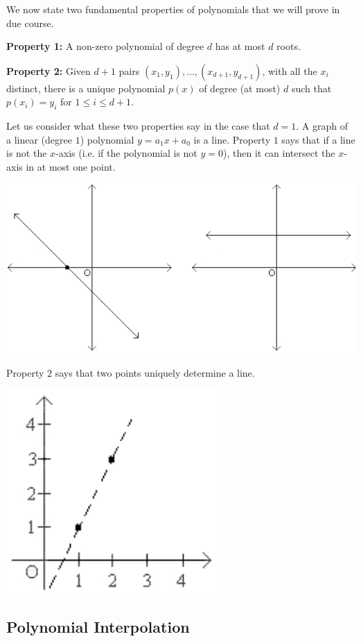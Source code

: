 \documentclass[11pt,fleqn]{article}
\begin{document}
We now state two fundamental properties of polynomials that we will prove
in due course.

\noindent
{\bf Property 1:} A non-zero polynomial of degree $d$ has at most $d$
roots.

\noindent
{\bf Property 2:} Given $d+1$ pairs $(x_1, y_1), \ldots, (x_{d+1}, y_{d+1})$,
with all the $x_i$ distinct, 
there is a unique polynomial $p(x)$ of degree (at most) $d$ such that
$p(x_i) = y_i$ for $1 \leq i \leq d+1$.

Let us consider what these two properties say in the case
that $d =1$. A graph of a linear (degree $1$) polynomial 
$y = a_1 x + a_0$ is a line. Property $1$ says that if a 
line is not the $x$-axis (i.e. if the polynomial is not $y = 0$), 
then it can intersect the $x$-axis in at most one point. 

\includegraphics[bb = -40 0 5 250, scale = .5]{line1}

Property $2$ says that two points uniquely determine a line. 

\includegraphics[bb = 0 0 125 145, scale = 0.7]{line3}


\subsection*{ Polynomial Interpolation}
 
\end{document}
